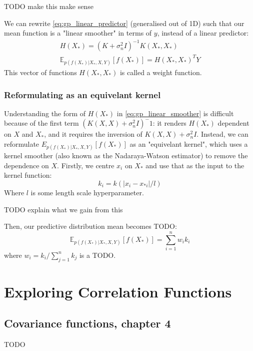 \documentclass[10pt]{article}
\begin{document}
TODO make this make sense

We can rewrite \ref{eq:gp_linear_predictor} (generalised out of 1D) such that our mean function is a "linear smoother" in terms of $y$, instead of a linear predictor: 
\begin{equation} \label{eq:gp_linear_smoother}
    \begin{aligned}
        H(X_*) = (K + \sigma^2_nI)^{-1}K(X_*,X_*) \\
        \mathbb{E}_{p(f(X_*)|X_*,X,Y)}[f(X_*)] = H(X_*, X_*)^T Y
    \end{aligned}
\end{equation}
This vector of functions $H(X_*, X_*)$ is called a weight function. 

\subsubsection{Reformulating as an equivelant kernel}
Understanding the form of $H(X_*)$ in \ref{eq:gp_linear_smoother} is difficult because of the first term $(K(X, X) + \sigma_n^2I)^-1$: it renders $H(X_*)$ dependent on $X$ and $X_*$, and it requires the inversion of $K(X, X) + \sigma^2_nI$. Instead, we can reformulate $E_{p(f(X_*)|X_*,X,Y)}[f(X_*)]$ as an "equivelant kernel", which uses a kernel smoother (also known as the Nadaraya-Watson estimator) to remove the dependence on $X$. Firstly, we centre $x_i$ on $X_*$ and use that as the input to the kernel function:
\begin{equation*}
    k_i = k(|x_i - x_{*i}|/l)
\end{equation*}
Where $l$ is some length scale hyperparameter. 

TODO explain what we gain from this

Then, our predictive distribution mean becomes TODO:
\begin{equation*}
    \mathbb{E}_{p(f(X_*)|X_*,X,Y)}[f(X_*)] = \sum_{i=1}^n w_i k_i
\end{equation*}
where $w_i = k_i / \sum_{j=1}^n k_j$ is a TODO.



\section{Exploring Correlation Functions}


\subsection{Covariance functions, chapter 4 \cite{gp-ml}}
TODO
\end{document}

